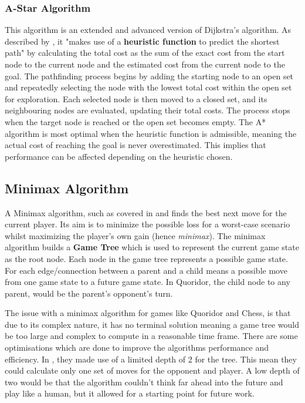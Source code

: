 \documentclass[review]{cmpreport}
\begin{document}
\subsubsection{A-Star Algorithm}
This algorithm is an extended and advanced version of Dijkstra's algorithm. As described by \cite{glendenning2005mastering}, it "makes use of a \textbf{heuristic function} to predict the shortest path" by calculating the total cost as the sum of the exact cost from the start node to the current node and the estimated cost from the current node to the goal. The pathfinding process begins by adding the starting node to an open set and repeatedly selecting the node with the lowest total cost within the open set for exploration. Each selected node is then moved to a closed set, and its neighbouring nodes are evaluated, updating their total costs. The process stops when the target node is reached or the open set becomes empty. The A* algorithm is most optimal when the heuristic function is admissible, meaning the actual cost of reaching the goal is never overestimated. This implies that performance can be affected depending on the heuristic chosen.

\subsection{Minimax Algorithm}
A Minimax algorithm, such as covered in \cite{plaat1996best} and \cite{strong2011minimax} finds the best next move for the current player. Its aim is to minimize the possible loss for a worst-case scenario whilst maximizing the player's own gain (hence \textit{minimax}). The minimax algorithm builds a \textbf{Game Tree} which is used to represent the current game state as the root node. Each node in the game tree represents a possible game state. For each edge/connection between a parent and a child means a possible move from one game state to a future game state. In Quoridor, the child node to any parent, would be the parent's opponent's turn.
\newline

\noindent The issue with a minimax algorithm for games like Quoridor and Chess, is that due to its complex nature, it has no terminal solution meaning a game tree would be too large and complex to compute in a reasonable time frame. There are some optimisations which are done to improve the algorithms performance and efficiency. In \cite{josequoridor}, they made use of a limited depth of 2 for the tree. This mean they could calculate only one set of moves for the opponent and player. A low depth of two would be that the algorithm couldn't think far ahead into the future and play like a human, but it allowed for a starting point for future work. 
\end{document}
